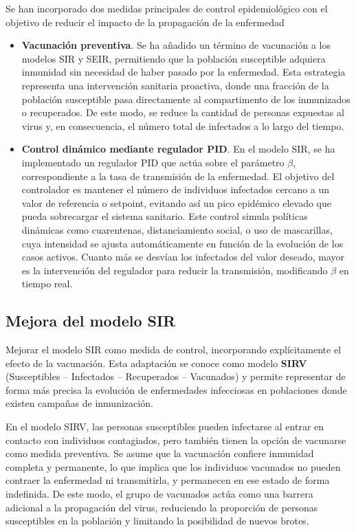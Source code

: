 Se han incorporado dos medidas principales de control epidemiológico con el objetivo de reducir el impacto de la propagación de la enfermedad
\begin{itemize}
    \item \textbf{Vacunación preventiva}. Se ha añadido un término de vacunación a los modelos SIR y SEIR, permitiendo que la población susceptible adquiera inmunidad sin necesidad de haber pasado por la enfermedad. Esta estrategia representa una intervención sanitaria proactiva, donde una fracción de la población susceptible pasa directamente al compartimento de los inmunizados o recuperados. De este modo, se reduce la cantidad de personas expuestas al virus y, en consecuencia, el número total de infectados a lo largo del tiempo.
    \item \textbf{Control dinámico mediante regulador PID}. En el modelo SIR, se ha implementado un regulador PID que actúa sobre el parámetro $\beta$, correspondiente a la tasa de transmisión de la enfermedad. El objetivo del controlador es mantener el número de individuos infectados cercano a un valor de referencia o setpoint, evitando así un pico epidémico elevado que pueda sobrecargar el sistema sanitario.
   Este control simula políticas dinámicas como cuarentenas, distanciamiento social, o uso de mascarillas, cuya intensidad se ajusta automáticamente en función de la evolución de los casos activos. Cuanto más se desvían los infectados del valor deseado, mayor es la intervención del regulador para reducir la transmisión, modificando $\beta$ en tiempo real.
\end{itemize}

\subsection{Mejora del modelo SIR}
Mejorar el modelo SIR como medida de control, incorporando explícitamente el efecto de la vacunación. Esta adaptación se conoce como modelo \textbf{SIRV} (Susceptibles – Infectados – Recuperados – Vacunados) y permite representar de forma más precisa la evolución de enfermedades infecciosas en poblaciones donde existen campañas de inmunización.

En el modelo SIRV, las personas susceptibles pueden infectarse al entrar en contacto con individuos contagiados, pero también tienen la opción de vacunarse como medida preventiva. Se asume que la vacunación confiere inmunidad completa y permanente, lo que implica que los individuos vacunados no pueden contraer la enfermedad ni transmitirla, y permanecen en ese estado de forma indefinida. De este modo, el grupo de vacunados actúa como una barrera adicional a la propagación del virus, reduciendo la proporción de personas susceptibles en la población y limitando la posibilidad de nuevos brotes.

